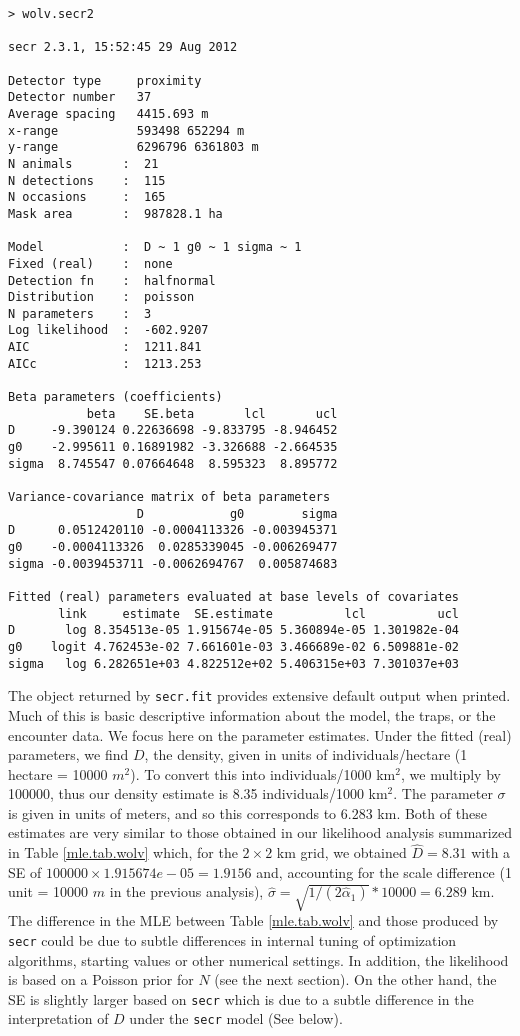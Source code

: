 {\small
\begin{verbatim}
> wolv.secr2

secr 2.3.1, 15:52:45 29 Aug 2012

Detector type     proximity 
Detector number   37 
Average spacing   4415.693 m 
x-range           593498 652294 m 
y-range           6296796 6361803 m 
N animals       :  21  
N detections    :  115 
N occasions     :  165 
Mask area       :  987828.1 ha 

Model           :  D ~ 1 g0 ~ 1 sigma ~ 1 
Fixed (real)    :  none 
Detection fn    :  halfnormal 
Distribution    :  poisson 
N parameters    :  3 
Log likelihood  :  -602.9207 
AIC             :  1211.841 
AICc            :  1213.253 

Beta parameters (coefficients) 
           beta    SE.beta       lcl       ucl
D     -9.390124 0.22636698 -9.833795 -8.946452
g0    -2.995611 0.16891982 -3.326688 -2.664535
sigma  8.745547 0.07664648  8.595323  8.895772

Variance-covariance matrix of beta parameters 
                  D            g0        sigma
D      0.0512420110 -0.0004113326 -0.003945371
g0    -0.0004113326  0.0285339045 -0.006269477
sigma -0.0039453711 -0.0062694767  0.005874683

Fitted (real) parameters evaluated at base levels of covariates 
       link     estimate  SE.estimate          lcl          ucl
D       log 8.354513e-05 1.915674e-05 5.360894e-05 1.301982e-04
g0    logit 4.762453e-02 7.661601e-03 3.466689e-02 6.509881e-02
sigma   log 6.282651e+03 4.822512e+02 5.406315e+03 7.301037e+03
\end{verbatim}
}

The object returned by \mbox{\tt secr.fit} provides extensive default
output when printed. Much of this is basic descriptive information
about the model, the traps, or the encounter data. We focus here on
the parameter estimates.  Under the fitted (real) parameters, we find
$D$, the density, given in units of individuals/hectare (1 hectare =
10000 $m^2$).  To convert this into individuals/1000 km$^2$, we
multiply by 100000, thus our density estimate is 8.35 individuals/1000
km$^2$.  The parameter $\sigma$ is given in units of meters, and so
this corresponds to $6.283$ km.  Both of these estimates are very
similar to those obtained in our likelihood analysis summarized in
Table \ref{mle.tab.wolv} which, for the $2 \times 2$ km grid, we
obtained $\hat{D} = 8.31$ with a SE of $100000 \times 1.915674e-05 =
1.9156$ and, accounting for the scale difference (1 unit = 10000 $m$
in the previous analysis), $\hat{\sigma} =
\sqrt{1/(2\hat{\alpha}_{1})}*10000 = 6.289$ km.  The difference in the
MLE between Table \ref{mle.tab.wolv} and those produced by \mbox{\tt
  secr} could be due to subtle differences in internal tuning of
optimization algorithms, starting values or other numerical
settings. In addition, the likelihood is based on a Poisson prior for
$N$ (see the next section).  On the other hand, the SE is slightly
larger based on \mbox{\tt secr} which is due to a subtle difference in
the interpretation of $D$ under the \mbox{\tt secr} model (See below).





